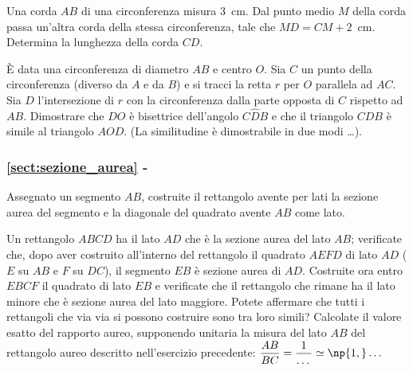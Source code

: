 \begin{esercizio}
\label{ese:6.105}
Una corda $AB$ di una circonferenza misura 3~cm. Dal punto medio $M$ 
della corda passa un'altra corda della stessa circonferenza, tale che 
$MD=CM+2$~cm. Determina la lunghezza della corda $CD$.
\end{esercizio}

\begin{esercizio}
\label{ese:6.106}
\`E data una circonferenza di diametro $AB$ e centro $O$. Sia $C$ un 
punto della circonferenza (diverso da $A$ e da $B$) e si tracci la 
retta $r$ per $O$ parallela ad $AC$. Sia $D$ l'intersezione di $r$ 
con la circonferenza dalla parte opposta di $C$ rispetto ad $AB$. 
Dimostrare che $DO$ è bisettrice dell'angolo $C\widehat{D}B$ e che il 
triangolo $CDB$ è simile al triangolo $AOD$. (La similitudine è 
dimostrabile in due modi \ldots{}).
\end{esercizio}

\begingroup
\hypersetup{linkcolor=black}
\subsubsection*{\ref{sect:sezione_aurea} - 
}
\endgroup

\begin{esercizio}
\label{ese:6.107}
Assegnato un segmento $AB$, costruite il rettangolo avente per lati 
la sezione aurea del segmento e la diagonale del quadrato avente $AB$ 
come lato.
\end{esercizio}

\begin{esercizio}
\label{ese:6.108}
Un rettangolo $ABCD$ ha il lato $AD$ che è la sezione aurea del lato 
$AB$; verificate che, dopo aver costruito all'interno del rettangolo 
il quadrato $AEFD$ di lato $AD$ ($E$ su $AB$ e $F$ su $DC$), il 
segmento $EB$ è sezione aurea di $AD$. Costruite ora entro $EBCF$ il 
quadrato di lato $EB$ e verificate che il rettangolo che rimane ha il 
lato minore che è sezione aurea del lato maggiore. Potete affermare 
che tutti i rettangoli che via via si possono costruire sono tra loro 
simili? Calcolate il valore esatto del rapporto aureo, supponendo 
unitaria la misura del lato $AB$ del rettangolo aureo descritto 
nell'esercizio precedente: $\dfrac{AB}{BC}=\dfrac{1}{\ldots{}}\simeq 
\np{1,}\ldots{}$
\end{esercizio}


